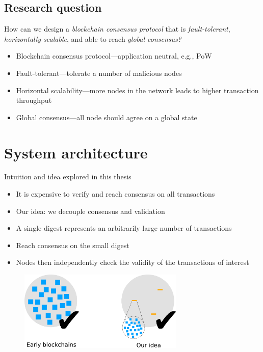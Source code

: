 \documentclass{beamer}
\begin{document}
\subsection{Research question}
\begin{frame}{\subsecname}
  \begin{block}{}
    \Large{
    How can we design a \emph{blockchain consensus protocol} that is \emph{fault-tolerant},
    \emph{horizontally scalable}, and able to reach \emph{global consensus?}
    }
  \end{block}
  \begin{itemize}
    \item Blockchain consensus protocol---application neutral, e.g., PoW
    \item Fault-tolerant---tolerate a number of malicious nodes
    \item Horizontal scalability---more nodes in the network leads to higher transaction throughput
    \item Global consensus---all node should agree on a global state
  \end{itemize}
\end{frame}

\section{System architecture}
\begin{frame}{Intuition and idea explored in this thesis}
  \begin{itemize}
    \item It is expensive to verify and reach consensus on all transactions
    \item Our idea: we decouple consensus and validation
    \item A single digest represents an arbitrarily large number of transactions
    \item Reach consensus on the small digest
    \item Nodes then independently check the validity of the transactions of interest
  \end{itemize}
  \begin{figure}[h]
  \includegraphics[width=0.7\textwidth]{idea}
  \centering
  \end{figure}
\end{frame}
\end{document}

